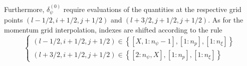 Furthermore, $\delta _{\psi }^{\left( 0\right) }$ require evaluations of the
quantities at the respective grid points $\left( l-1/2,i+1/2,j+1/2\right) $
and $\left( l+3/2,j+1/2,j+1/2\right) $. As for the momentum grid
interpolation, indexes are shifted according to the rule
\begin{equation}
\left\{
\begin{array}{l}
\left( l-1/2,i+1/2,j+1/2\right) \in \left\{ \left[ X,1:n_{\psi }-1\right]
,\left[ 1:n_{p}\right] ,\left[ 1:n_{\xi }\right] \right\} \\
\left( l+3/2,i+1/2,j+1/2\right) \in \left\{ \left[ 2:n_{\psi },X\right]
,\left[ 1:n_{p}\right] ,\left[ 1:n_{\xi }\right] \right\}
\end{array}
\right.
\end{equation}
